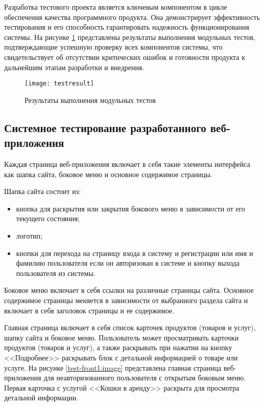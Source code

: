 Разработка тестового проекта является ключевым компонентом в цикле обеспечения качества программного продукта. Она демонстрирует эффективность тестирования и его способность гарантировать надежность функционирования системы. На рисунке \ref{testresult:image} представлены результаты выполнения модульных тестов, подтверждающие успешную проверку всех компонентов системы, что свидетельствует об отсутствии критических ошибок и готовности продукта к дальнейшим этапам разработки и внедрения.

\begin{figure}[H] %
\centering
\texttt{[image: testresult]}
\caption{Результаты выполнения модульных тестов}
\label{testresult:image}
\end{figure}

\subsection{Системное тестирование разработанного веб-приложения}

Каждая страница веб-приложения включает в себя такие элементы интерфейса как шапка сайта, боковое меню и основное содержимое страницы.

Шапка сайта состоит из:
\begin{itemize}
    \item кнопка для раскрытия или закрытия бокового меню в зависимости от его текущего состояния;
    \item логотип;
    \item кнопки для перехода на страницу входа в систему и регистрации или имя и фамилию пользователя если он авторизован в системе и кнопку выхода пользователя из системы.
\end{itemize}

Боковое меню включает в себя ссылки на различные страницы сайта.
Основное содержимое страницы меняется в зависимости от выбранного раздела сайта и включает в себя заголовок страницы и ее содержимое. 

Главная страница включает в себя список карточек продуктов (товаров и услуг), шапку сайта и боковое меню. Пользователь может просматривать карточки продуктов (товаров и услуг), а также раскрывать при нажатии на кнопку <<Подробнее>> раскрывать блок с детальной информацией о товаре или услуге.
На рисунке \ref{test-front1:image} представлена главная страница веб-приложения для неавторизованного пользователя с открытым боковым меню. Первая карточка с услугой <<Кошки в аренду>> раскрыта для просмотра детальной информации.

